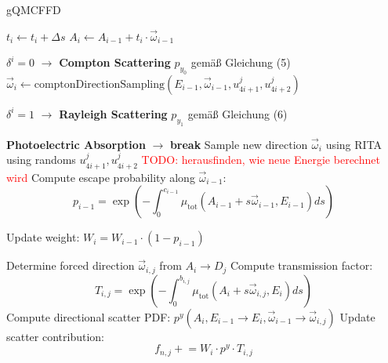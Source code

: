 \begin{algorithm}{gQMCFFD}
\begin{algorithmic}[1]
     \State $t_i \gets t_i + \Delta s$
     \State $A_i \gets A_{i-1} + t_i \cdot
    \vec{\omega}_{i-1}$  \EndWhile
    

        \State $\delta^i=0$ $\to$ \textbf{Compton Scattering}
        \State $p_{y_0}$ gemäß Gleichung (5)
        \State $\vec{\omega}_{i} \gets \text{comptonDirectionSampling}(E_{i-1}, \vec{\omega}_{i-1}, u^j_{4i+1}, u^j_{4i+2})$

        
        \State $\delta^i=1$ $\to$ \textbf{Rayleigh Scattering} \State
        $p_{y_1}$ gemäß Gleichung (6)

        \Else 
            \State \textbf{Photoelectric Absorption} $\to$ \textbf{break}
    \EndIf
    \State Sample new direction $\vec{\omega}_i$ using RITA using randoms $u^j_{4i+1}, u^j_{4i+2}$
    \State \textcolor{red}{TODO: herausfinden, wie neue Energie berechnet wird}
    \State Compute escape probability along $\vec{\omega}_{i-1}$:
    $$p_{i-1} = \exp\left(-\int_0^{c_{i-1}} \mu_{\text{tot}}(A_{i-1} + s\vec{\omega}_{i-1}, E_{i-1}) ds\right)$$
    
    \State Update weight: $W_i = W_{i-1} \cdot (1 - p_{i-1})$

        \State Determine forced direction $\vec{\omega}_{i,j}$ from $A_i \to D_j$
        \State Compute transmission factor:
        \[
        T_{i,j} = \exp\left(-\int_0^{b_{i,j}} \mu_{\text{tot}}(A_i + s\vec{\omega}_{i,j}, E_i) ds\right)
        \]
        \State Compute directional scatter PDF: $p^y(A_i, E_{i-1} \rightarrow E_i, \vec{\omega}_{i-1} \rightarrow \vec{\omega}_{i,j})$
        \State Update scatter contribution:
        \[
        f_{n,j} \mathrel{+}= W_i \cdot p^y \cdot T_{i,j}
        \]
    \EndFor

\EndFor

\end{algorithmic}
\end{algorithm}

